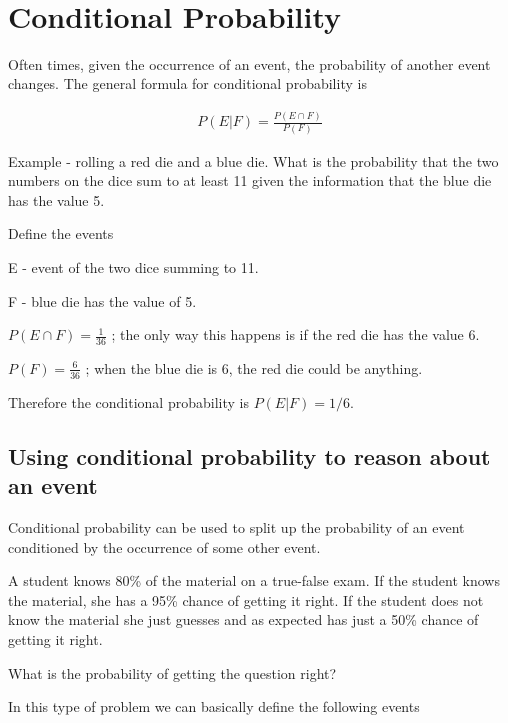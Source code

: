 \documentclass[12pt]{article}
\begin{document}
\begin{center}
\\
\vspace{1cm}
\end{center}

\vspace{0.5cm}\noindent


\section*{Conditional Probability}
Often times, given the occurrence of an event, the probability of another event changes. The general formula for conditional probability is

\begin{align*}
P(E|F) = \frac{P(E \cap F)}{P(F)}
\end{align*}

Example - rolling a red die and a blue die. What is the probability that the two numbers on the dice sum to at least 11 given the information that the blue die has the value 5.

Define the events

E - event of the two dice summing to 11.

F - blue die has the value of 5.

$P(E \cap F) = \frac{1}{36}$ ; the only way this happens is if the red die has the value 6.

$P(F) = \frac{6}{36}$ ; when the blue die is 6, the red die could be anything.

Therefore the conditional probability is $P(E|F) = 1/6$.

\subsection*{Using conditional probability to reason about an event}
Conditional probability can be used to split up the probability of an event conditioned by the occurrence of some other event.

A student knows 80\% of the material on a true-false exam. If the student knows the material, she has a 95\% chance of getting it right. If the student does not know the material she just guesses and as expected has just a 50\% chance of getting it right.

What is the probability of getting the question right?

In this type of problem we can basically define the following events
\end{document}
